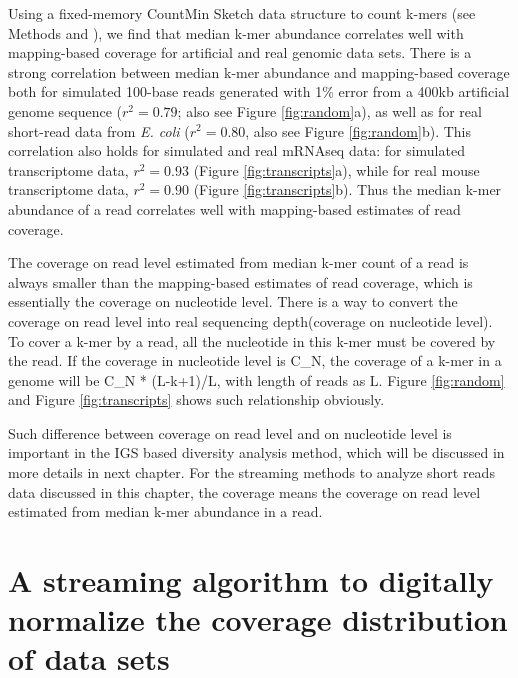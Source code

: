 Using a fixed-memory CountMin Sketch data structure to count k-mers (see
Methods and \cite{countminsketch}), we find that median k-mer abundance
correlates well with mapping-based coverage for artificial and real genomic
data sets.  There is a strong correlation between median k-mer abundance and
mapping-based coverage both for simulated 100-base reads generated with 1\%
error from a 400kb artificial genome sequence ($r^2 = 0.79$; also see Figure
\ref{fig:random}a), as well as for real short-read data from {\em E. coli}
($r^2 = 0.80$, also see Figure \ref{fig:random}b).  This correlation also holds
for simulated and real mRNAseq data: for simulated transcriptome data, $r^2 =
0.93$ (Figure \ref{fig:transcripts}a), while for real mouse transcriptome data,
$r^2 = 0.90$ (Figure \ref{fig:transcripts}b). Thus the median k-mer abundance
of a read correlates well with mapping-based estimates of read coverage.

The coverage on read level estimated from median k-mer count of a read is
always smaller than the mapping-based estimates of read coverage, which is
essentially the coverage on nucleotide level. There is a way to convert the
coverage on read level into real sequencing depth(coverage on nucleotide
level). To cover a k-mer by a read, all the nucleotide in this k-mer must be
covered by the read. If the coverage in nucleotide level is C\_N, the coverage
of a k-mer in a genome will be C\_N * (L-k+1)/L, with length of reads as L.
\cite{Kelley2010} Figure \ref{fig:random} and Figure \ref{fig:transcripts}
shows such relationship obviously.

Such difference between coverage on read level and on nucleotide level is
important in the IGS based diversity analysis method, which will be discussed
in more details in next chapter. For the streaming methods to analyze short
reads data discussed in this chapter, the coverage means the coverage on read
level estimated from median k-mer abundance in a read.



\section{A streaming algorithm to digitally normalize the coverage distribution
of data sets}


